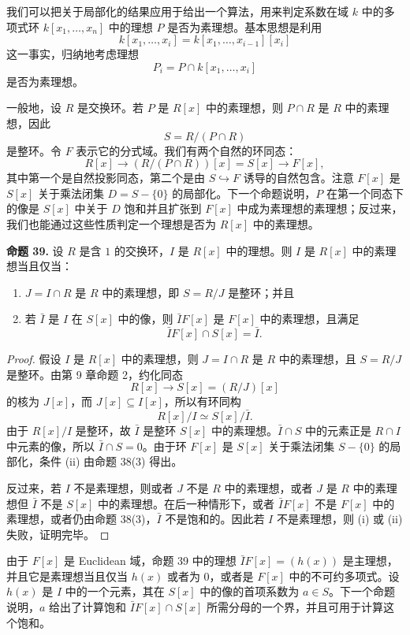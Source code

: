 我们可以把关于局部化的结果应用于给出一个算法，用来判定系数在域 $k$ 中的多项式环 $k[x_1,\ldots,x_n]$ 中的理想 $P$ 是否为素理想。基本思想是利用
\[
k[x_1,\ldots,x_i]=k[x_1,\ldots,x_{i-1}][x_i]
\]
这一事实，归纳地考虑理想
\[
P_i=P\cap k[x_1,\ldots,x_i]
\]
是否为素理想。

一般地，设 $R$ 是交换环。若 $P$ 是 $R[x]$ 中的素理想，则 $P\cap R$ 是 $R$ 中的素理想，因此
\[
S=R/(P\cap R)
\]
是整环。令 $F$ 表示它的分式域。我们有两个自然的环同态：
\[
R[x]\longrightarrow (R/(P\cap R))[x]=S[x]\longrightarrow F[x],
\]
其中第一个是自然投影同态，第二个是由 $S\hookrightarrow F$ 诱导的自然包含。注意 $F[x]$ 是 $S[x]$ 关于乘法闭集 $D=S-\{0\}$ 的局部化。下一个命题说明，$P$ 在第一个同态下的像是 $S[x]$ 中关于 $D$ 饱和并且扩张到 $F[x]$ 中成为素理想的素理想；反过来，我们也能通过这些性质判定一个理想是否为 $R[x]$ 中的素理想。

\noindent\textbf{命题 39.} 设 $R$ 是含 $1$ 的交换环，$I$ 是 $R[x]$ 中的理想。则 $I$ 是 $R[x]$ 中的素理想当且仅当：
\begin{enumerate}[label=\roman*.]
	\item $J=I\cap R$ 是 $R$ 中的素理想，即 $S=R/J$ 是整环；并且
	\item 若 $\bar I$ 是 $I$ 在 $S[x]$ 中的像，则 $\bar I F[x]$ 是 $F[x]$ 中的素理想，且满足
	\[
	\bar I F[x]\cap S[x]=\bar I.
	\]
\end{enumerate}

\begin{proof}
	假设 $I$ 是 $R[x]$ 中的素理想，则 $J=I\cap R$ 是 $R$ 中的素理想，且 $S=R/J$ 是整环。由第 9 章命题 2，约化同态
	\[
	R[x]\longrightarrow S[x]=(R/J)[x]
	\]
	的核为 $J[x]$，而 $J[x]\subseteq I[x]$，所以有环同构
	\[
	R[x]/I\simeq S[x]/\bar I.
	\]
	由于 $R[x]/I$ 是整环，故 $\bar I$ 是整环 $S[x]$ 中的素理想。$\bar I\cap S$ 中的元素正是 $R\cap I$ 中元素的像，所以 $\bar I\cap S=0$。由于环 $F[x]$ 是 $S[x]$ 关于乘法闭集 $S-\{0\}$ 的局部化，条件 (ii) 由命题 38(3) 得出。
	
	反过来，若 $I$ 不是素理想，则或者 $J$ 不是 $R$ 中的素理想，或者 $J$ 是 $R$ 中的素理想但 $\bar I$ 不是 $S[x]$ 中的素理想。在后一种情形下，或者 $\bar I F[x]$ 不是 $F[x]$ 中的素理想，或者仍由命题 38(3)，$\bar I$ 不是饱和的。因此若 $I$ 不是素理想，则 (i) 或 (ii) 失败，证明完毕。
\end{proof}

由于 $F[x]$ 是 Euclidean 域，命题 39 中的理想 $\bar I F[x]=(h(x))$ 是主理想，并且它是素理想当且仅当 $h(x)$ 或者为 $0$，或者是 $F[x]$ 中的不可约多项式。设 $h(x)$ 是 $I$ 中的一个元素，其在 $S[x]$ 中的像的首项系数为 $a\in S$。下一个命题说明，$a$ 给出了计算饱和 $\bar I F[x]\cap S[x]$ 所需分母的一个界，并且可用于计算这个饱和。

